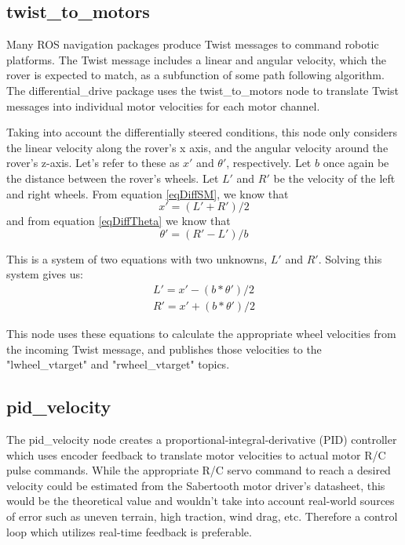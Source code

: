 \subsection{twist\_to\_motors}
Many ROS navigation packages produce Twist messages to command robotic platforms. The Twist message includes a linear and angular velocity, which the rover is expected to match, as a subfunction of some path following algorithm. The differential\_drive package uses the twist\_to\_motors node to translate Twist messages into individual motor velocities for each motor channel. 

Taking into account the differentially steered conditions, this node only considers the linear velocity along the rover's x axis, and the angular velocity around the rover's z-axis. Let's refer to these as \(x'\) and \(\theta '\), respectively. Let \(b\) once again be the distance between the rover's wheels. Let \(L'\) and \(R'\) be the velocity of the left and right wheels. From equation \ref{eqDiffSM}, we know that
\begin{equation*}
x' = (L' + R') / 2
\end{equation*}
and from equation \ref{eqDiffTheta} we know that
\begin{equation*}
\theta ' = (R' - L') / b
\end{equation*}

This is a system of two equations with two unknowns, \(L'\) and \(R'\). Solving this system gives us: 
\begin{align*}
L' = x' - (b * \theta ') / 2 \\
R' = x' + (b * \theta ') / 2
\end{align*}

This node uses these equations to calculate the appropriate wheel velocities from the incoming Twist message, and publishes those velocities to the "lwheel\_vtarget" and "rwheel\_vtarget" topics. 

\subsection{pid\_velocity}
The pid\_velocity node creates a  proportional-integral-derivative (PID) controller which uses encoder feedback to translate motor velocities to actual motor R/C pulse commands. While the appropriate R/C servo command to reach a desired velocity could be estimated from the Sabertooth motor driver's datasheet, this would be the theoretical value and wouldn't take into account real-world sources of error such as uneven terrain, high traction, wind drag, etc. Therefore a control loop which utilizes real-time feedback is preferable.

